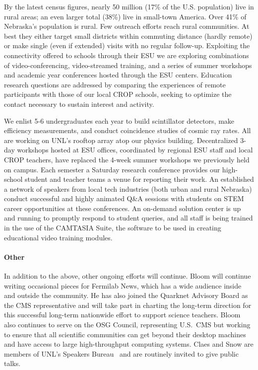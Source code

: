 By the latest census figures, nearly 50 million (17\% of the U.S. population) live in rural areas; an even larger total (38\%) live in small-town America.  Over 41\% of Nebraska's population is rural. Few outreach efforts reach rural communities. At best they either target small districts within commuting distance (hardly remote) or make single (even if extended) visits with no regular follow-up. Exploiting the connectivity offered to schools through their ESU we are exploring combinations of video-conferencing, video-streamed training, and a series of summer workshops and academic year conferences hosted through the ESU centers. Education research questions are addressed by comparing the experiences of remote participants with those of our local CROP schools, seeking to optimize the contact necessary to sustain interest and activity.

We enlist 5-6 undergraduates each year to build scintillator detectors, make efficiency measurements, and conduct coincidence studies of cosmic ray rates.  All are working on UNL’s rooftop array atop our physics building. Decentralized 3-day workshops hosted at ESU offices, coordinated by regional ESU staff and local CROP teachers, have replaced the 4-week summer workshops we previously held on campus. Each semester a Saturday research conference provides our high-school student and teacher teams a venue for reporting their work. An established a network of speakers from local tech industries (both urban and rural Nebraska) conduct successful and highly animated Q\&A sessions with students on STEM career opportunities at these conferences. An on-demand solution center is up and running to promptly respond to student queries, and all staff is being trained in the use of the CAMTASIA Suite, the software to be used in creating educational video training modules.

\paragraph{Other} In addition to the above, other ongoing efforts will continue.  Bloom will continue writing occasional pieces for Fermilab News, which has a wide audience inside and outside the community.  He has also joined the Quarknet Advisory Board as the CMS representative and will take part in charting the long-term direction for this successful long-term nationwide effort to support science teachers.  Bloom also continues to serve on the OSG Council, representing U.S.~CMS but working to ensure that all scientific communities can get beyond their desktop machines and have access to large high-throughput computing systems.  Claes and Snow are members of UNL's Speakers Bureau~\cite{bib:speakers} and are routinely invited to give public talks.
